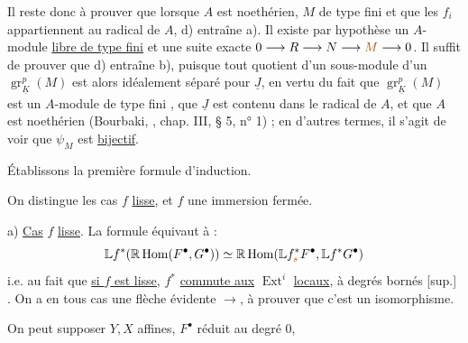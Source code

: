 Il reste donc à prouver que lorsque $A$ est noethérien, $M$ de type fini et que les  $f_i$ appartiennent au radical de $A$, d) entraîne a). Il existe par hypothèse un $A$-module \uline{libre de type fini}  et une suite exacte
$0\longrightarrow R\longrightarrow N\longrightarrow\unsure{M}\longrightarrow0$.
Il suffit de prouver que d) entraîne b), puisque tout quotient d'un sous-module d'un $\operatorname{gr}_{\underline K}^p(M)$ est alors idéalement séparé pour $\underline J$, en vertu du fait que $\operatorname{gr}_{\underline K}^p(M)$ est un $A$-module de type fini , que $\underline J$ est contenu dans le radical de $A$,  et que $A$ est noethérien (Bourbaki, , chap. III, § 5, n° 1) ; en d'autres termes, il s'agit de voir que $\psi_M$ est \uline{bijectif}.

Établissons la première formule d'induction.

On distingue les cas $f$ \uline{lisse}, et $f$ une immersion fermée.

a) \uline{Cas} $f$ \uline{lisse}. La formule équivaut à :
\[
\mathbb{L}f^*(\mathbb{R}\operatorname{Hom}(F^\bullet,G^\bullet))
\simeq \mathbb{R}\operatorname{Hom}(\mathbb{L}f^*_{\unsure{s}}F^\bullet,\mathbb{L}f^*G^\bullet)
\]
i.e. au fait que \uline{si $f$ est lisse}, $f^*$ \uline{commute aux} $\operatorname{Ext}^i$ \uline{locaux},
à degrés bornés [sup.] . On a en tous cas une flèche évidente $\longrightarrow$, à prouver que c'est un isomorphisme.


On peut supposer $Y,X$ affines, $F^\bullet$ réduit au degré $0$, 

